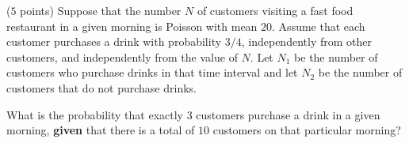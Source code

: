 \documentclass[reqno,letterpaper, onsided,10pt]{amsart}
\newcommand{\sol}[1]{\par\noindent{\bf Solution:} #1}
\renewcommand{\sol}[1]{}
\begin{document}
\sol{
Let $N_1$ denote the r.v. which stands for the number of ``major''floods, and let $N_2$ be the number of
``minor'' floods. According to the {\em "Thinning" theorem},  $N_1$ and $N_2$ are
independent and 
\begin{equation}%
    \nonumber 
    \begin{split}
      N_1 & \sim Poisson(\frac{1}{5}\cdot 5=1), \\
      N_2 & \sim Poisson(\frac{4}{5}\cdot 5=4).  
    \end{split}
\end{equation}  
We are ready to calculate the conditional probability 
\begin{equation}%
    \nonumber 
    \begin{split}
      \PP[N_1  = 2 \, | \, N = 5] 
      & = \frac{\PP[N_1  = 2,  N = 5]}{\PP[N=5]}\\
      & = \frac{\PP[N_1  = 2,  N_1 + N_2 = 5]}{\PP[N=5]}\\
      & = \frac{\PP[N_1  = 2,  N_2 = 3]}{\PP[N=5]}. 
    \end{split}
\end{equation}
Since $N_1$ and $N_2$ are independent, this probability equals 
\begin{equation}%
    \nonumber 
    \begin{split}
     \frac{\PP[N_1  = 2]\,\PP[N_2 = 3]}{\PP[N=5]}
     & = \frac{e^{-1} \, \frac{1^2}{2!} \cdot
       e^{-4}\,\frac{4^3}{3!}}{e^{-5}\, \frac{5^5}{5!}}\\ 
     & = \frac{\frac{1^2}{2!} \cdot
       \frac{4^3}{3!}}{\frac{5^5}{5!}}\\ 
     & = \frac{4^3 \cdot 5!}{5^5 \cdot 2!\cdot 3!} = \frac{2^7}{5^4} = 0.2048.
    \end{split}
\end{equation}
Of course, we obtained the binomial conditional distribution above. This is a fact we have shown in class and you could have just used it directly. 
}

\medskip

\begin{problem} ($5$ points) %
Suppose that the number $N$ of customers visiting a fast food restaurant in a given morning is Poisson with mean $20$. Assume that each customer purchases a drink with probability $3/4$, independently from other customers, and independently from the value of $N.$ Let $N_1$ be the number of customers who purchase drinks in that time interval and let $N_2$ be the number of customers that do not purchase drinks. 

What is the probability that exactly $3$ customers purchase a drink in a given morning, {\bf given} that there is a total of $10$ customers on that particular morning?
\end{problem}
\end{document}
